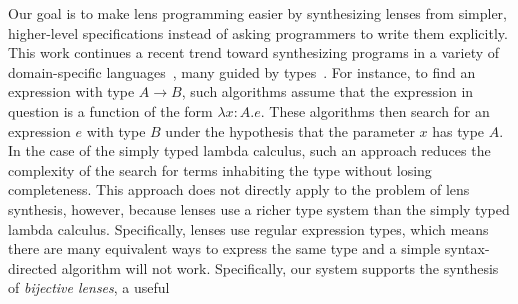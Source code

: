 \documentclass[numbers,10pt,preprint\ifanon ,nocopyrightspace\fi]{sigplanconf}
\begin{document}
Our goal is to make lens programming easier by synthesizing
lenses from simpler, higher-level specifications
instead of asking programmers to write them explicitly.
%
This work continues a recent trend toward synthesizing programs in a variety
of domain-specific languages~\cite[etc.]{yag+:pldi16, osera+:pldi15,
  frankle+:popl16, armando+:pldi16}, many guided by
types~\cite{osera+:pldi15,frankle+:popl16,armando+:pldi16}.  
%
\iffull
{} 
For instance,
to find an expression with type $A \rightarrow B$, such algorithms assume
that the expression in question is a function of the form
$\lambda x{:}A. e$.  These algorithms then search for an expression $e$ with
type $B$ under the hypothesis that the parameter $x$ has type $A$.
%
In
the case of the simply typed lambda calculus, such an approach reduces
the complexity of the search for terms inhabiting the type without
losing completeness.  This approach does not directly apply to the
problem of lens synthesis, however, because
lenses use a richer type system
than the simply typed lambda calculus.
Specifically, lenses use regular expression types, which means 
there are many equivalent ways to express the same type and a simple
syntax-directed algorithm will not work.
\fi
%
%
Specifically, our system supports the synthesis of \emph{bijective lenses}, a useful 
\end{document}
